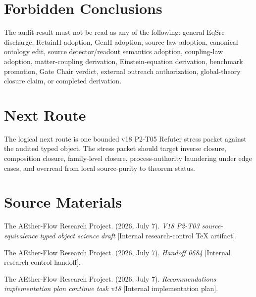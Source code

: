 \documentclass[11pt]{article}
\newcommand{\EqSrc}{\mathrm{EqSrc}}
\newcommand{\RetainH}{\mathrm{RetainH}}
\newcommand{\GenH}{\mathrm{GenH}}
\begin{document}
\section*{Forbidden Conclusions}

The audit result must not be read as any of the following: general \(\EqSrc\)
discharge, \(\RetainH\) adoption, \(\GenH\) adoption, source-law adoption,
canonical ontology edit, source detector/readout semantics adoption,
coupling-law adoption, matter-coupling derivation, Einstein-equation
derivation, benchmark promotion, Gate Chair verdict, external outreach
authorization, global-theory closure claim, or completed derivation.

\section*{Next Route}

The logical next route is one bounded v18 P2-T05 Refuter stress packet against
the audited typed object. The stress packet should target inverse closure,
composition closure, family-level closure, process-authority laundering under
edge cases, and overread from local source-purity to theorem status.

\section*{Source Materials}

The AEther-Flow Research Project. (2026, July 7). \textit{V18 P2-T03
source-equivalence typed object science draft} [Internal research-control TeX
artifact].

The AEther-Flow Research Project. (2026, July 7). \textit{Handoff 0684}
[Internal research-control handoff].

The AEther-Flow Research Project. (2026, July 7). \textit{Recommendations
implementation plan continue task v18} [Internal implementation plan].
\end{document}
